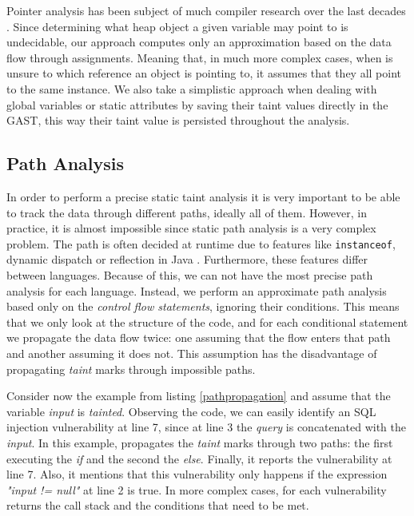 Pointer analysis has been subject of much compiler research over the last decades \cite{spath2016boomerang,hind2001pointer}. Since determining what heap object a given variable may point to is undecidable, our approach computes only an approximation based on the data flow through assignments. Meaning that, in much more complex cases, when \toolname{} is unsure to which reference an object is pointing to, it assumes that they all point to the same instance. We also take a simplistic approach when dealing with global variables or static attributes by saving their taint values directly in the GAST, this way their taint value is persisted throughout the analysis.


\subsection{Path Analysis} In order to perform a precise static taint analysis it is very important to be able to track the data through different paths, ideally all of them. However, in practice, it is almost impossible since static path analysis is a very complex problem. The path is often decided at runtime due to features like \texttt{instanceof}, dynamic dispatch or reflection in Java \cite{hammer2008static}. Furthermore, these features differ between languages. Because of this, we can not have the most precise path analysis for each language. Instead, we perform an approximate path analysis based only on the \textit{control flow statements}, ignoring their conditions. This means that we only look at the structure of the code, and for each conditional statement we propagate the data flow twice: one assuming that the flow enters that path and another assuming it does not. This assumption has the disadvantage of propagating \textit{taint} marks through impossible paths. 

Consider now the example from listing \ref{pathpropagation} and assume that the variable \textit{input} is \textit{tainted}. Observing the code, we can easily identify an SQL injection vulnerability at line 7, since at line 3 the \textit{query} is concatenated with the \textit{input}.
In this example, \toolname{} propagates the \textit{taint} marks through two paths: the first executing the \textit{if} and the second the \textit{else}. Finally, it reports the vulnerability at line 7. Also, it mentions that this vulnerability only happens if the expression \textit{"input != null"} at line 2 is true. In more complex cases, for each vulnerability \toolname{} returns the call stack and the conditions that need to be met.

